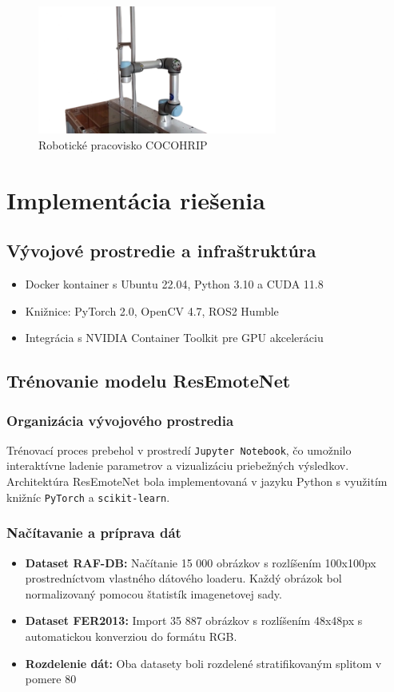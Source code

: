 \begin{figure}[h]
\centering
\includegraphics[width=0.7\textwidth]{img/cocohrip.png}
\caption{Robotické pracovisko COCOHRIP}
\end{figure}

\section{Implementácia riešenia}
\subsection{Vývojové prostredie a infraštruktúra}
\begin{itemize}
\item Docker kontainer s Ubuntu 22.04, Python 3.10 a CUDA 11.8
\item Knižnice: PyTorch 2.0, OpenCV 4.7, ROS2 Humble
\item Integrácia s NVIDIA Container Toolkit pre GPU akceleráciu
\end{itemize}

\subsection{Trénovanie modelu ResEmoteNet}
\subsubsection{Organizácia vývojového prostredia}
Trénovací proces prebehol v prostredí \texttt{Jupyter Notebook}, čo umožnilo interaktívne ladenie parametrov a vizualizáciu priebežných výsledkov. Architektúra ResEmoteNet bola implementovaná v jazyku Python s využitím knižníc \texttt{PyTorch} a \texttt{scikit-learn}.

\subsubsection{Načítavanie a príprava dát}
\begin{itemize}
\item \textbf{Dataset RAF-DB:} Načítanie 15 000 obrázkov s rozlíšením 100x100px prostredníctvom vlastného dátového loaderu. Každý obrázok bol normalizovaný pomocou štatistík imagenetovej sady.
\item \textbf{Dataset FER2013:} Import 35 887 obrázkov s rozlíšením 48x48px s automatickou konverziou do formátu RGB.
\item \textbf{Rozdelenie dát:} Oba datasety boli rozdelené stratifikovaným splitom v pomere 80%
\end{itemize}

